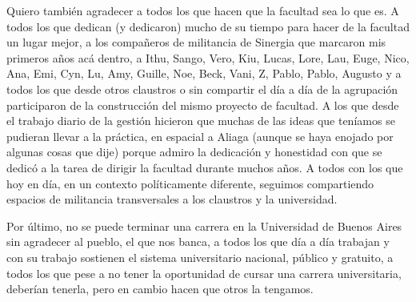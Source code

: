 \documentclass{article}
\numberwithin{figure}{section}
\begin{document}
    Quiero también agradecer a todos los que hacen que la facultad sea lo que es. A todos los que dedican (y dedicaron) mucho de su tiempo para hacer de la facultad un lugar mejor, a los compañeros de militancia de Sinergia que marcaron mis primeros años acá dentro, a Ithu, Sango, Vero, Kiu, Lucas, Lore, Lau, Euge, Nico, Ana, Emi, Cyn, Lu, Amy, Guille, Noe, Beck, Vani, Z, Pablo, Pablo, Augusto y a todos los que desde otros claustros o sin compartir el día a día de la agrupación participaron de la construcción del mismo proyecto de facultad. A los que desde el trabajo diario de la gestión hicieron que muchas de las ideas que teníamos se pudieran llevar a la práctica, en espacial a Aliaga (aunque se haya enojado por algunas cosas que dije) porque admiro la dedicación y honestidad con que se dedicó a la tarea de dirigir la facultad durante muchos años. A todos con los que hoy en día, en un contexto políticamente diferente, seguimos compartiendo espacios de militancia transversales a los claustros y la universidad.
    
    Por último, no se puede terminar una carrera en la Universidad de Buenos Aires sin agradecer al pueblo, el que nos banca, a todos los que día a día trabajan y con su trabajo sostienen el sistema universitario nacional, público y gratuito, a todos los que pese a no tener la oportunidad de cursar una carrera universitaria, deberían tenerla, pero en cambio hacen que otros la tengamos.
    

    
    

    
    
    
    

\clearpage
\end{document}
